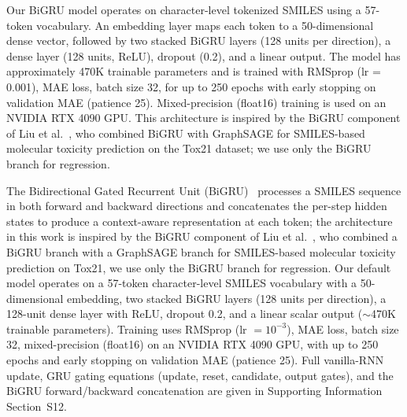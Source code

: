 \documentclass[journal=jcisd8,manuscript=article]{achemso}
\newcommand{\added}[1]{{\color{addedblue}#1}}
\begin{document}
{Our BiGRU model operates on character-level tokenized SMILES using a 57-token vocabulary.
An embedding layer maps each token to a 50-dimensional dense vector, followed by two stacked BiGRU layers (128 units per direction), a dense layer (128 units, ReLU), dropout (0.2), and a linear output.
The model has approximately 470K trainable parameters and is trained with RMSprop (lr = 0.001), MAE loss, batch size 32, for up to 250 epochs with early stopping on validation MAE (patience 25).
Mixed-precision (float16) training is used on an NVIDIA RTX 4090 GPU.
This architecture is inspired by the BiGRU component of Liu et al.~\cite{liuPredictionMolecularToxicity2023}, who combined BiGRU with GraphSAGE for SMILES-based molecular toxicity prediction on the Tox21 dataset; we use only the BiGRU branch for regression.}

\added{The Bidirectional Gated Recurrent Unit (BiGRU)~\cite{schuster1997bidirectional,cho2014learning} processes a SMILES sequence in both forward and backward directions and concatenates the per-step hidden states to produce a context-aware representation at each token; the architecture in this work is inspired by the BiGRU component of Liu et al.~\cite{liuPredictionMolecularToxicity2023}, who combined a BiGRU branch with a GraphSAGE branch for SMILES-based molecular toxicity prediction on Tox21, we use only the BiGRU branch for regression. Our default model operates on a 57-token character-level SMILES vocabulary with a 50-dimensional embedding, two stacked BiGRU layers (128 units per direction), a 128-unit dense layer with ReLU, dropout 0.2, and a linear scalar output ($\sim$470K trainable parameters). Training uses RMSprop (lr $= 10^{-3}$), MAE loss, batch size 32, mixed-precision (float16) on an NVIDIA RTX 4090 GPU, with up to 250 epochs and early stopping on validation MAE (patience 25). Full vanilla-RNN update, GRU gating equations (update, reset, candidate, output gates), and the BiGRU forward/backward concatenation are given in Supporting Information Section~S12.}
\end{document}
